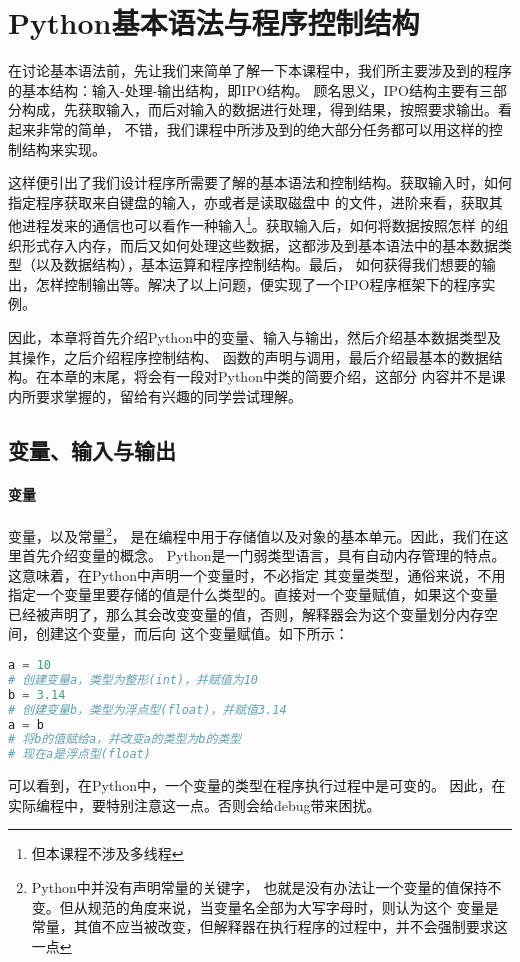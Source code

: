 \chapter{Python基本语法与程序控制结构}
\lstset{style=Python}
在讨论基本语法前，先让我们来简单了解一下本课程中，我们所主要涉及到的程序的基本结构：输入-处理-输出结构，即IPO结构。
顾名思义，IPO结构主要有三部分构成，先获取输入，而后对输入的数据进行处理，得到结果，按照要求输出。看起来非常的简单，
不错，我们课程中所涉及到的绝大部分任务都可以用这样的控制结构来实现。

这样便引出了我们设计程序所需要了解的基本语法和控制结构。获取输入时，如何指定程序获取来自键盘的输入，亦或者是读取磁盘中
的文件，进阶来看，获取其他进程发来的通信也可以看作一种输入\footnote{但本课程不涉及多线程}。获取输入后，如何将数据按照怎样
的组织形式存入内存，而后又如何处理这些数据，这都涉及到基本语法中的基本数据类型（以及数据结构），基本运算和程序控制结构。最后，
如何获得我们想要的输出，怎样控制输出等。解决了以上问题，便实现了一个IPO程序框架下的程序实例。

因此，本章将首先介绍Python中的变量、输入与输出，然后介绍基本数据类型及其操作，之后介绍程序控制结构、
函数的声明与调用，最后介绍最基本的数据结构。在本章的末尾，将会有一段对Python中类的简要介绍，这部分
内容并不是课内所要求掌握的，留给有兴趣的同学尝试理解。
\section{变量、输入与输出}
\subsubsection{变量}
变量，以及常量\footnote{Python中并没有声明常量的关键字，
也就是没有办法让一个变量的值保持不变。但从规范的角度来说，当变量名全部为大写字母时，则认为这个
变量是常量，其值不应当被改变，但解释器在执行程序的过程中，并不会强制要求这一点}，
是在编程中用于存储值以及对象的基本单元。因此，我们在这里首先介绍变量的概念。
Python是一门弱类型语言，具有自动内存管理的特点。这意味着，在Python中声明一个变量时，不必指定
其变量类型，通俗来说，不用指定一个变量里要存储的值是什么类型的。直接对一个变量赋值，如果这个变量
已经被声明了，那么其会改变变量的值，否则，解释器会为这个变量划分内存空间，创建这个变量，而后向
这个变量赋值。如下所示：

\begin{lstlisting}[language=Python]
a = 10
# 创建变量a，类型为整形(int)，并赋值为10
b = 3.14
# 创建变量b，类型为浮点型(float)，并赋值3.14
a = b
# 将b的值赋给a，并改变a的类型为b的类型
# 现在a是浮点型(float)
\end{lstlisting}
可以看到，在Python中，一个变量的类型在程序执行过程中是可变的。
因此，在实际编程中，要特别注意这一点。否则会给debug带来困扰。

